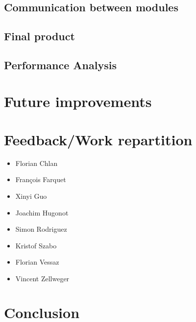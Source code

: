 \documentclass{article}
\begin{document}
\subsection{Communication between modules} 
\subsection{Final product}
\subsection{Performance Analysis}

\section{Future improvements} %

\section{Feedback/Work repartition} %
\begin{itemize}
\item Florian Chlan
\item François Farquet
\item Xinyi Guo
\item Joachim Hugonot
\item Simon Rodriguez
\item Kristof Szabo
\item Florian Vessaz
\item Vincent Zellweger
\end{itemize}
\section{Conclusion}
\end{document}
